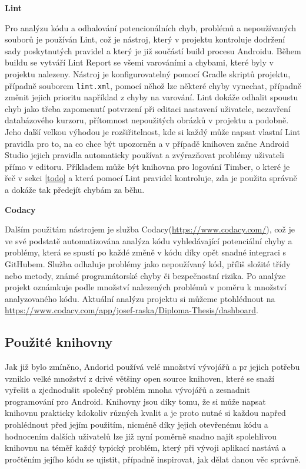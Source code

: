 \documentclass{article}
\begin{document}
\noindent
 \textbf{Lint}


 Pro analýzu kódu a odhalování potencionálních chyb, problémů a nepoužívaných souborů je používán Lint,
  což je nástroj, který v projektu kontroluje dodržení sady poskytnutých pravidel a který
  je již součástí build procesu Androidu. Během buildu se vytváří Lint Report
  se všemi varováními a chybami, které byly v projektu nalezeny. Nástroj je konfigurovatelný pomocí
  Gradle skriptů projektu, případně souborem \texttt{lint.xml}, pomocí něhož lze některé chyby
  vynechat, případně změnit jejich prioritu například z chyby na varování.
  Lint dokáže odhalit spoustu chyb jako třeba zapomenutí potvrzení při editaci nastavení uživatele,
  nezavření databázového kurzoru, přítomnost nepoužitých obrázků v projektu a podobně.
  Jeho další velkou výhodou je rozšiřitelnost, kde si každý může napsat vlastní Lint pravidla pro to, na co chce být upozorněn
  a v případě knihoven začne Android Studio jejich pravidla automaticky používat a zvýrazňovat problémy uživateli
  přímo v editoru.
  Příkladem může být knihovna pro logování Timber, o které je řeč v sekci \ref{todo} a která pomocí Lint pravidel
  kontroluje, zda je použita správně a dokáže tak předejít chybám za běhu.

\noindent
\textbf{Codacy}


Dalším použitám nástrojem je služba Codacy(\url{https://www.codacy.com/}), což je ve své podstatě
automatizována analýza kódu vyhledávající potenciální chyby a problémy, která se spustí po každé změně v kódu
díky opět snadné integraci s GitHubem. Služba odhaluje problémy jako nepoužívaný kód, příliš složité
třídy nebo metody, známé programátorské chyby či bezpečnostní rizika. Po analýze projekt oznámkuje podle
množství nalezených problémů v poměru k množství analyzovaného kódu. Aktuální analýzu projektu si můžeme ptohlédnout
na \url{https://www.codacy.com/app/josef-raska/Diploma-Thesis/dashboard}.

\subsection{Použité knihovny}
Jak již bylo zmíněno, Andorid používá velé množství vývojářů a pr jejich potřebu vzniklo velké množství
z drivé většiny open source knihoven, které se snaží vyřešit a zjednodušit společný problém mnoha vývojářů
a zesnadnit programování pro Android. Knihovny jsou díky tomu, že si může napsat knihovnu prakticky kdokoliv
různých kvalit a je proto nutné si každou napřed prohlédnout před jejím použitím, nicméně díky jejich
otevřenému kódu a hodnocením dalších uživatelů lze již nyní poměrně snadno najít spolehlivou knihovnu na téměř každý
typický problém, který při vývoji aplikací nastává a pročtěním jejího kódu se ujistit, případně inspirovat,
jak dělat danou věc správně.
\end{document}
